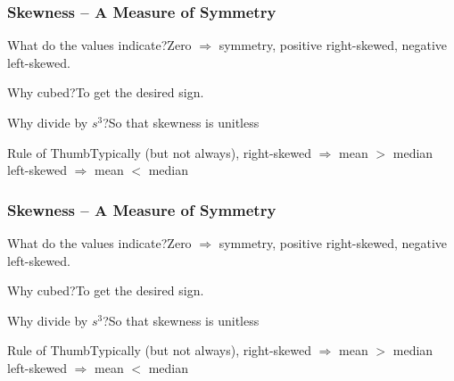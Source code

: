 \documentclass[handout]{beamer}
\begin{document}
\begin{frame}

\frametitle{Skewness -- A Measure of Symmetry}

\begin{center}
\end{center}
\pause
\begin{block}{What do the values indicate?}Zero $\Rightarrow$ symmetry, positive right-skewed, negative left-skewed.\end{block} \pause
\begin{block}{Why cubed?}To get the desired sign.\end{block} \pause
\begin{block}{Why divide by $s^3$?}So that skewness is unitless\end{block}\pause
\begin{block}{Rule of Thumb}Typically (but not always), right-skewed $\Rightarrow$ mean $>$ median\\ left-skewed $\Rightarrow$ mean $<$ median\end{block}

\end{frame}


\begin{frame}

\frametitle{Skewness -- A Measure of Symmetry}

\begin{center}
\end{center}
\pause
\begin{block}{What do the values indicate?}Zero $\Rightarrow$ symmetry, positive right-skewed, negative left-skewed.\end{block} \pause
\begin{block}{Why cubed?}To get the desired sign.\end{block} \pause
\begin{block}{Why divide by $s^3$?}So that skewness is unitless\end{block}\pause
\begin{block}{Rule of Thumb}Typically (but not always), right-skewed $\Rightarrow$ mean $>$ median\\ left-skewed $\Rightarrow$ mean $<$ median\end{block}

\end{frame}
\end{document}
